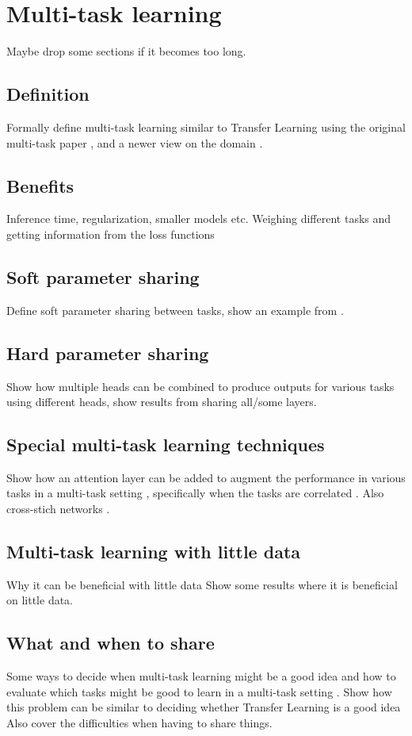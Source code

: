 \chapter{Multi-task learning}
Maybe drop some sections if it becomes too long.
\section{Definition}
Formally define multi-task learning similar to Transfer Learning using the original multi-task paper \citep{origMultitask}, and a newer view on the domain \citep{surveyOnMultiTask}.
\section{Benefits}
Inference time, regularization, smaller models etc. Weighing different tasks and getting information from the loss functions \citep{lossWeighting} \citep{usingUncertaintyToWeighLosses}
\section{Soft parameter sharing}
Define soft parameter sharing between tasks, show an example from \citep{mutualLearning}.
\section{Hard parameter sharing}
Show how multiple heads can be combined to produce outputs for various tasks using different heads, show results from sharing all/some layers. \citep{visualPerson} \citep{selfDriving} \citep{healthyDrink}
\section{Special multi-task learning techniques}
Show how an attention layer can be added to augment the performance in various tasks in a multi-task setting \citep{multiTaskAttention}, specifically when the tasks are correlated \citep{multiTaskWeather} \citep{weatherNet}. Also cross-stich networks \citep{crossStitch}.
\section{Multi-task learning with little data}
Why it can be beneficial with little data \citep{surveyOnMultiTask} Show some results where it is beneficial on little data.
\section{What and when to share}
Some ways to decide when multi-task learning might be a good idea and how to evaluate which tasks might be good to learn in a multi-task setting \citep{taskonomy} \citep{whichTasks}.
Show how this problem can be similar to deciding whether Transfer Learning is a good idea \citep{whatAndWhereToTransfer} \citep{transferringMidLevelRepresentations}
Also cover the difficulties when having to share things.